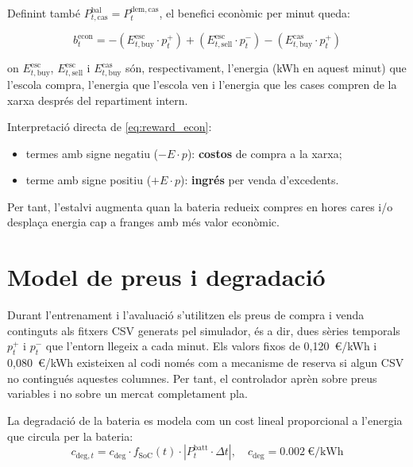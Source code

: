 \documentclass[a4paper,12pt,twoside]{ThesisStyle}
\begin{document}
Definint també $P_{t,\mathrm{cas}}^{\mathrm{bal}} = P_t^{\mathrm{dem,cas}}$, el benefici econòmic per minut queda:

\begin{equation}
  b_t^{\mathrm{econ}} = -\left(E_{t,\mathrm{buy}}^{\mathrm{esc}} \cdot p_t^{+}\right) + \left(E_{t,\mathrm{sell}}^{\mathrm{esc}} \cdot p_t^{-}\right) - \left(E_{t,\mathrm{buy}}^{\mathrm{cas}} \cdot p_t^{+}\right)
  \label{eq:reward_econ}
\end{equation}

on $E_{t,\mathrm{buy}}^{\mathrm{esc}}$, $E_{t,\mathrm{sell}}^{\mathrm{esc}}$ i $E_{t,\mathrm{buy}}^{\mathrm{cas}}$ són, respectivament, l'energia (kWh en aquest minut) que l'escola compra, l'energia que l'escola ven i l'energia que les cases compren de la xarxa després del repartiment intern.

Interpretació directa de \eqref{eq:reward_econ}:
\begin{itemize}
  \item termes amb signe negatiu ($-E \cdot p$): \textbf{costos} de compra a la xarxa;
  \item terme amb signe positiu ($+E \cdot p$): \textbf{ingrés} per venda d'excedents.
\end{itemize}

Per tant, l'estalvi augmenta quan la bateria redueix compres en hores cares i/o desplaça energia cap a franges amb més valor econòmic.

\section{Model de preus i degradació}

Durant l'entrenament i l'avaluació s'utilitzen els preus de compra i venda continguts als fitxers CSV generats pel simulador, és a dir, dues sèries temporals $p_t^{+}$ i $p_t^{-}$ que l'entorn llegeix a cada minut. Els valors fixos de 0,120~€/kWh i 0,080~€/kWh existeixen al codi només com a mecanisme de reserva si algun CSV no contingués aquestes columnes. Per tant, el controlador aprèn sobre preus variables i no sobre un mercat completament pla.

La degradació de la bateria es modela com un cost lineal proporcional a l'energia que circula per la bateria:
\begin{equation}
  c_{\mathrm{deg},t} = c_{\mathrm{deg}} \cdot f_{\mathrm{SoC}}(t) \cdot \left|P_t^{\mathrm{batt}} \cdot \Delta t\right|, \quad c_{\mathrm{deg}} = 0.002~\text{€/kWh}
    \label{eq:degradacio}
\end{equation}
\end{document}
